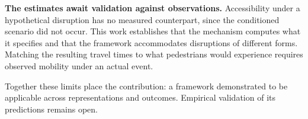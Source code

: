 \textbf{The estimates await validation against observations.} Accessibility under a hypothetical disruption has no measured counterpart, since the conditioned scenario did not occur. This work establishes that the mechanism computes what it specifies and that the framework accommodates disruptions of different forms. Matching the resulting travel times to what pedestrians would experience requires observed mobility under an actual event.

Together these limits place the contribution: a framework demonstrated to be applicable across representations and outcomes. Empirical validation of its predictions remains open.
